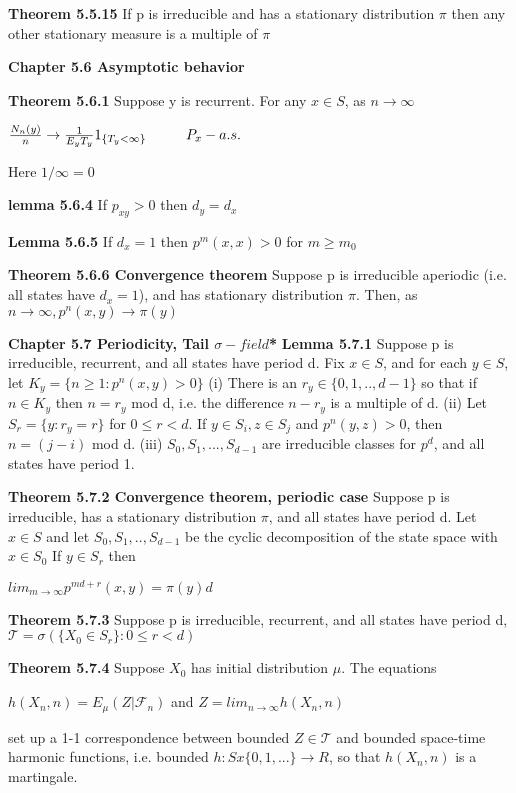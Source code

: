 \documentclass{article}
\newcommand\tab[1][1cm]{\hspace*{#1}}
\begin{document}
\textbf {Theorem 5.5.15} If p is irreducible and has a stationary distribution $\pi$ then any other stationary measure is a multiple of $\pi$

\textbf {Chapter 5.6 Asymptotic behavior}

\textbf {Theorem 5.6.1} Suppose y is recurrent. For any $x \in S$, as $n \to \infty$
\begin{center}
$\frac{N_n(y)}{n} \to \frac{1}{E_y T_y} 1_{\{T_y < \infty\}} \tab P_x -a.s.$
\end{center}
Here $1/\infty = 0$

\textbf {lemma 5.6.4} If $p_{xy} > 0$ then $d_y = d_x$

\textbf {Lemma 5.6.5} If $d_x = 1$ then $p^m (x,x) > 0$ for $m \geq m_0$

\textbf {Theorem 5.6.6 Convergence theorem} Suppose p is irreducible aperiodic (i.e. all states have $d_x = 1$), and has stationary distribution $\pi$. Then, as $n \to \infty, p^n(x,y) \to \pi(y)$

\textbf {Chapter 5.7 Periodicity, Tail $\sigma-field$*}
\textbf {Lemma 5.7.1} Suppose p is irreducible, recurrent, and all states have period d. Fix $x \in S$, and for each $y \in S$, let $K_y = \{ n \geq 1 : p^n (x,y) > 0 \}$ (i) There is an $r_y \in \{0, 1,..,d-1\}$ so that if $n \in K_y$ then $n = r_y$ mod d, i.e. the difference $n - r_y$ is a multiple of d. (ii) Let $S_r = \{y :  r_y = r\}$ for $0 \leq r < d$. If $y \in S_i, z \in S_j$ and $p^n(y,z) > 0$, then $n = (j-i)$ mod d. (iii) $S_0, S_1, ..., S_{d-1}$ are irreducible classes for $p^d$, and all states have period 1.

\textbf {Theorem 5.7.2 Convergence theorem, periodic case} Suppose p is irreducible, has a stationary distribution $\pi$, and all states have period d. Let $x \in S$ and let $S_0, S_1,..,S_{d-1}$ be the cyclic decomposition of the state space with $x \in S_0$ If $y \in S_r$ then
\begin{center}
$lim_{m \to \infty} p^{md+r}(x,y) = \pi(y) d$
\end{center}

\textbf {Theorem 5.7.3} Suppose p is irreducible, recurrent, and all states have period d, $\mathcal{T} = \sigma(\{X_0 \in S_r\}: 0 \leq r < d)$

\textbf {Theorem 5.7.4} Suppose $X_0$ has initial distribution $\mu$. The equations
\begin{center}
$h(X_n, n) = E_\mu (Z|\mathcal{F}_n)$ \tab and \tab $Z = lim_{n \to \infty} h(X_n, n)$
\end{center}
set up a 1-1 correspondence between bounded $Z \in \mathcal{T}$ and bounded space-time harmonic functions, i.e. bounded $h : S x \{0,1,...\} \to R$, so that $h(X_n, n)$ is a martingale.
\end{document}

